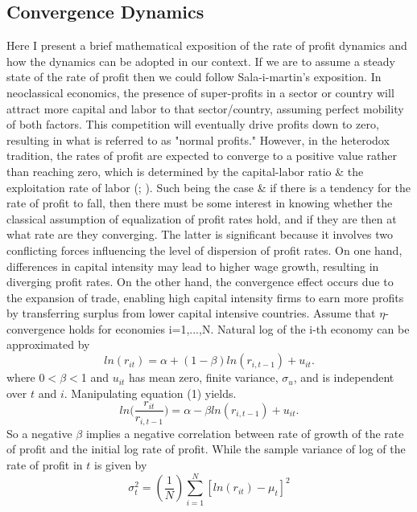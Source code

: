 \documentclass[10pt]{article}
\begin{document}
\subsection{Convergence Dynamics}
Here I present a brief mathematical exposition of the rate of profit dynamics and how the dynamics can be adopted in our context. If we are to assume a steady state of the rate of profit then we could follow Sala-i-martin's exposition. In neoclassical economics, the presence of super-profits in a sector or country will attract more capital and labor to that sector/country, assuming perfect mobility of both factors. This competition will eventually drive profits down to zero, resulting in what is referred to as "normal profits." However, in the heterodox tradition, the rates of profit are expected to converge to a positive value rather than reaching zero, which is determined by the capital-labor ratio \& the exploitation rate of labor (\citet{GlickOchoa1990}; \citet{LianosDroucopoulos1993}). Such being the case \& if there is a tendency for the rate of profit to fall, then there must be some interest in knowing whether the classical assumption of equalization of profit rates hold, and if they are then at what rate are they converging. The latter is significant because it involves two conflicting forces influencing the level of dispersion of profit rates. On one hand, differences in capital intensity may lead to higher wage growth, resulting in diverging profit rates. On the other hand, the convergence effect occurs due to the expansion of trade, enabling high capital intensity firms to earn more profits by transferring surplus from lower capital intensive countries. Assume that $\eta$-convergence holds for economies i=1,...,N. Natural log of the i-th economy can be approximated by \begin{equation*}
    ln(r_{it}) = \alpha + (1-\beta)ln(r_{i,t-1}) + u_{it}.
\end{equation*}
where 0$<\beta<$1 and $u_{it}$ has mean zero, finite variance, $\sigma_{u}$, and is independent over $t$ and $i$. Manipulating equation (1) yields. 
\begin{equation*}
    ln\Bigg(\frac{r_{it}}{r_{i,t-1}}\Bigg) = \alpha - \beta ln(r_{i,t-1}) + u_{it}.
\end{equation*}
So a negative $\beta$ implies a negative correlation between rate of growth of the rate of profit and the initial log rate of profit. While the sample variance of log of the rate of profit in $t$ is given by 
\begin{equation*}
    \sigma_{t}^{2} = (\frac{1}{N}) \sum^{N}_{i=1} [ln(r_{it}) - \mu_{t}]^{2}
\end{equation*}
\end{document}
